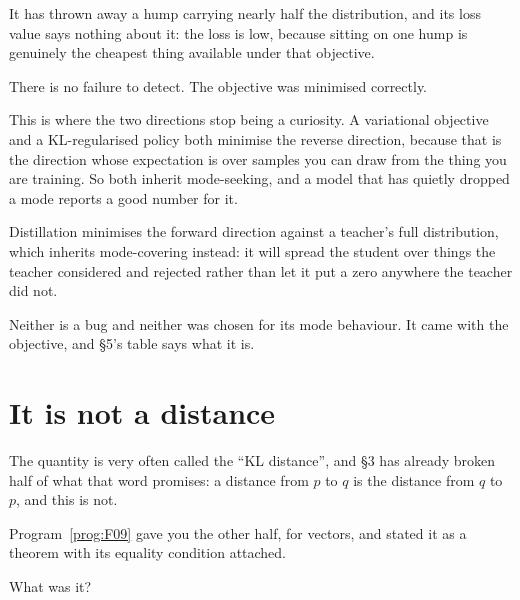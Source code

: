 \begin{fr}
\begin{ansblock}
It has thrown away a hump carrying nearly half the distribution, and its loss
value says nothing about it: the loss is low, because sitting on one hump is
genuinely the cheapest thing available under that objective.

There is no failure to detect. The objective was minimised correctly.
\end{ansblock}

\begin{aibox}
This is where the two directions stop being a curiosity. A variational
objective and a KL-regularised policy both minimise the reverse direction,
because that is the direction whose expectation is over samples you can draw
from the thing you are training. So both inherit mode-seeking, and a model
that has quietly dropped a mode reports a good number for it.

Distillation minimises the forward direction against a teacher's full
distribution, which inherits mode-covering instead: it will spread the
student over things the teacher considered and rejected rather than let it
put a zero anywhere the teacher did not.

Neither is a bug and neither was chosen for its mode behaviour. It came with
the objective, and §5's table says what it is.
\end{aibox}

\end{fr}

\section{It is not a distance}
\label{sec:P30-notadistance}

\begin{fr}
The quantity is very often called the \enquote{KL distance}, and §3 has
already broken half of what that word promises: a distance from $p$ to $q$
is the distance from $q$ to $p$, and this is not.

Program~\ref{prog:F09} gave you the other half, for vectors, and stated it as
a theorem with its equality condition attached.

What was it?
\dotline
\nextframe
\end{fr}

